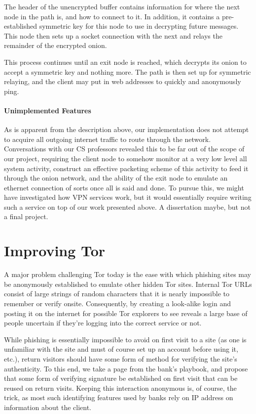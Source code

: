 \documentclass[12pt]{article}
\begin{document}
The header of the unencrypted buffer contains information for where the next node in the path is, and how to connect to it. In addition, it contains a pre-established symmetric key for this node to use in decrypting future messages. This node then sets up a socket connection with the next and relays the remainder of the encrypted onion.

This process continues until an exit node is reached, which decrypts its onion to accept a symmetric key and nothing more. The path is then set up for symmetric relaying, and the client may put in web addresses to quickly and anonymously ping. 

\paragraph{Unimplemented Features}
As is apparent from the description above, our implementation does not attempt to acquire all outgoing internet traffic to route through the network. Conversations with our CS professors revealed this to be far out of the scope of our project, requiring the client node to somehow monitor at a very low level all system activity, construct an effective packeting scheme of this activity to feed it through the onion network, and the ability of the exit node to emulate an ethernet connection of sorts once all is said and done. To pursue this, we might have investigated how VPN services work, but it would essentially require writing such a service on top of our work presented above. A dissertation maybe, but not a final project.

\section{Improving Tor}
A major problem challenging Tor today is the ease with which phishing sites may be anonymously established to emulate other hidden Tor sites. Internal Tor URLs consist of large strings of random characters that it is nearly impossible to remember or verify onsite. Consequently, by creating a look-alike login and posting it on the internet for possible Tor explorers to see reveals a large base of people uncertain if they're logging into the correct service or not.

While phishing is essentially impossible to avoid on first visit to a site (as one is unfamiliar with the site and must of course set up an account before using it, etc.), return visitors should have some form of method for verifying the site's authenticity. To this end, we take a page from the bank's playbook, and propose that some form of verifying signature be established on first visit that can be reused on return visits. Keeping this interaction anonymous is, of course, the trick, as most such identifying features used by banks rely on IP address on information about the client.
\end{document}
